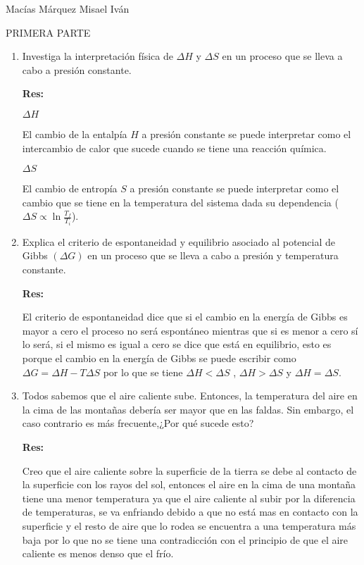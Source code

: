 \documentclass[12pt,a4paper]{article}
\begin{document}
Macías Márquez Misael Iván


PRIMERA PARTE

\begin{enumerate}






\item Investiga la interpretación física de $\Delta H$ y $\Delta S$ en un proceso que se lleva a cabo a presión constante.

\textbf{Res:}

$\Delta H $

El cambio de la entalpía $H$ a presión constante se puede interpretar como el intercambio de calor que sucede cuando se tiene una reacción química.


$\Delta S$

El cambio de entropía $S$ a presión constante se puede interpretar como el cambio que se tiene en la temperatura del sistema dada su dependencia ($\Delta S \propto \ln{\frac{T_f}{T_i}}$).






\item Explica el criterio de espontaneidad y equilibrio asociado al potencial de Gibbs $(\Delta G)$ en un proceso que se lleva a cabo a presión y temperatura constante.

\textbf{Res:}

El criterio de espontaneidad dice que si el cambio en la energía de Gibbs es mayor a cero el proceso no será espontáneo mientras que si es menor a cero sí lo será, si el mismo es igual a cero se dice que está en equilibrio, esto es porque el cambio en la energía de Gibbs se puede escribir como $\Delta G = \Delta H - T \Delta S$ por lo que se tiene $\Delta H < \Delta S$ , $\Delta H > \Delta S$ y $ \Delta H = \Delta S$.







\item Todos sabemos que el aire caliente sube. Entonces, la temperatura del aire en la cima de las montañas debería ser mayor que en las faldas. Sin embargo, el caso contrario es más frecuente,¿Por qué sucede esto?

\textbf{Res:}

Creo que el aire caliente sobre la superficie de la tierra se debe al contacto de la superficie con los rayos del sol, entonces el aire en la cima de una montaña tiene una menor temperatura ya que el aire caliente al subir por la diferencia de temperaturas, se va enfriando debido a que no está mas en contacto con la superficie y el resto de aire que lo rodea se encuentra a una temperatura más baja por lo que no se tiene una contradicción con el principio de que el aire caliente es menos denso que el frío.



    
    
\end{enumerate}
\end{document}
